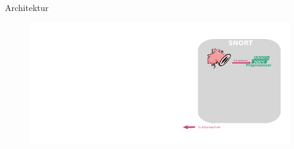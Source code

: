 \begin{frame}{Architektur}
    \begin{figure}
    	\centering
    	\includegraphics[width=\textwidth]{./images/2.pdf}
    \end{figure}
\end{frame}

